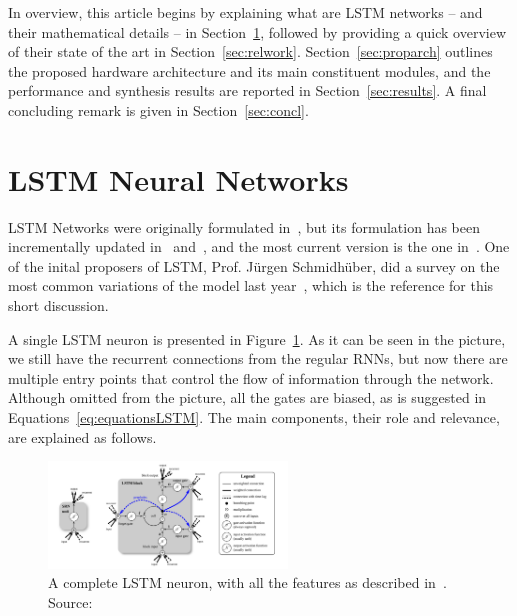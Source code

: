 \documentclass{IEEEtran}
\begin{document}
In overview, this article begins by explaining what are LSTM networks -- and their mathematical 
details -- in Section~\ref{sec:lstmnn}, followed by providing a quick overview of their state 
of the art in Section~\ref{sec:relwork}. Section~\ref{sec:proparch} outlines the proposed 
hardware architecture and its main constituent modules, and the performance and synthesis 
results are reported in Section~\ref{sec:results}. A final concluding remark is given in Section~\ref{sec:concl}.

\section{LSTM Neural Networks}\label{sec:lstmnn}
LSTM Networks were originally formulated in~\cite{Hoch97}, but its formulation has been incrementally 
updated in~\cite{Gers00} and~\cite{Gers2000}, and the most current version is the one in~\cite{Graves05}. 
One of the inital proposers of LSTM, Prof. Jürgen Schmidhüber, did a survey on the most common variations 
of the model last year~\cite{Greff15}, which is the reference for this short discussion. 

A single LSTM neuron is presented in Figure~\ref{fig:lstmneuron}. As it can be seen in the picture, 
we still have the recurrent connections from the regular RNNs, but now there are multiple entry points 
that control the flow of information through the network. Although omitted from the picture, all the 
gates are biased, as is suggested in Equations~\ref{eq:equationsLSTM}. The main components, their 
role and relevance, are explained as follows.

\begin{figure}[!t]
	\centering
	\includegraphics[width=2.5in]{figures/lstmneuron.png}
    \caption{A complete LSTM neuron, with all the features as described in~\cite{Graves05}. Source:~\cite{Greff15}}
	\label{fig:lstmneuron}
\end{figure}
\end{document}
